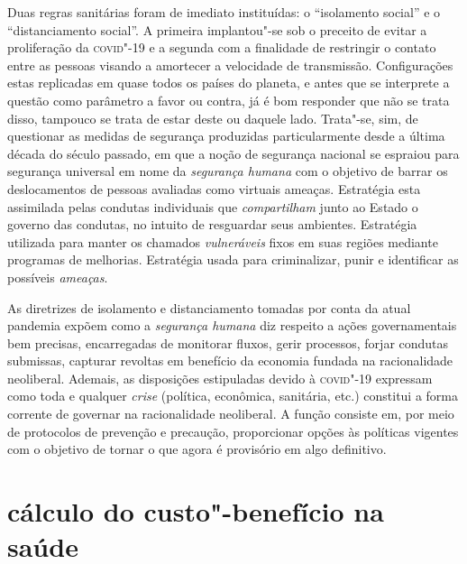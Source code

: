 Duas regras sanitárias foram de imediato instituídas: o ``isolamento
social'' e o ``distanciamento social''. A primeira implantou"-se sob o
preceito de evitar a proliferação da \textsc{covid}"-19 e a segunda com a
finalidade de restringir o contato entre as pessoas visando a amortecer
a velocidade de transmissão. Configurações estas replicadas em quase
todos os países do planeta, e antes que se interprete a questão como
parâmetro a favor ou contra, já é bom responder que não se trata disso,
tampouco se trata de estar deste ou daquele lado. Trata"-se, sim, de
questionar as medidas de segurança produzidas particularmente desde a
última década do século passado, em que a noção de segurança nacional se
espraiou para segurança universal em nome da \emph{segurança humana} com
o objetivo de barrar os deslocamentos de pessoas avaliadas como virtuais
ameaças. Estratégia esta assimilada pelas condutas individuais que
\emph{compartilham} junto ao Estado o governo das condutas, no intuito
de resguardar seus ambientes. Estratégia utilizada para manter os
chamados \emph{vulneráveis} fixos em suas regiões mediante programas de
melhorias. Estratégia usada para criminalizar, punir e identificar as
possíveis \emph{ameaças}.

As diretrizes de isolamento e distanciamento tomadas por conta da atual
pandemia expõem como a \emph{segurança humana} diz respeito a ações
governamentais bem precisas, encarregadas de monitorar fluxos, gerir
processos, forjar condutas submissas, capturar revoltas em benefício da
economia fundada na racionalidade neoliberal. Ademais, as disposições
estipuladas devido à \textsc{covid}"-19 expressam como toda e qualquer
\emph{crise} (política, econômica, sanitária, etc.) constitui a forma
corrente de governar na racionalidade neoliberal. A função consiste em,
por meio de protocolos de prevenção e precaução, proporcionar opções às
políticas vigentes com o objetivo de tornar o que agora é provisório em
algo definitivo.

\section{cálculo do custo"-benefício na saúde}

